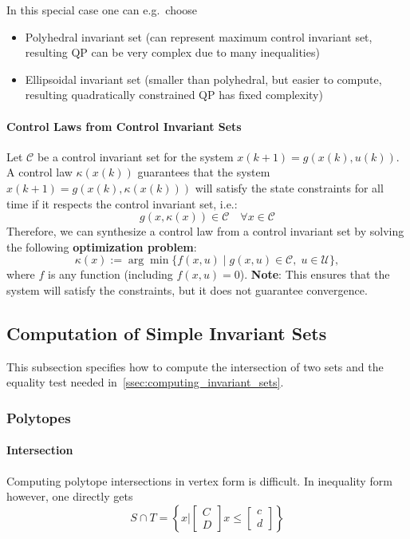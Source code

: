 \newpar{}

In this special case one can e.g.\ choose
\begin{itemize}
    \item Polyhedral invariant set (can represent maximum control invariant set, resulting QP can be very complex due to many inequalities)
    \item Ellipsoidal invariant set (smaller than polyhedral, but easier to compute, resulting quadratically constrained QP has fixed complexity)
\end{itemize}

\paragraph{Control Laws from Control Invariant Sets}

Let $\mathcal{C}$ be a control invariant set for the system $x(k + 1) = g(x(k), u(k))$.
\newpar{}
A control law $\kappa(x(k))$ guarantees that the system $x(k + 1) = g(x(k), \kappa(x(k)))$ will satisfy the state constraints for all time if it respects the control invariant set, i.e.:
\begin{equation*}
    g(x, \kappa(x)) \in \mathcal{C} \quad \forall x \in \mathcal{C}
\end{equation*}
Therefore, we can synthesize a control law from a control invariant set by solving the following \textbf{optimization problem}:
\begin{equation*}
    \kappa(x) := \arg\min \{ f(x, u) \mid g(x, u) \in \mathcal{C},\; u \in \mathcal{U} \},
\end{equation*}
where $f$ is any function (including $f(x, u) = 0$).
\newpar{}
\textbf{Note}: This ensures that the system will satisfy the constraints, but it does not guarantee convergence.

\subsection{Computation of Simple Invariant Sets}
This subsection specifies how to compute the intersection of two sets and the equality test needed in~\ref{ssec:computing_invariant_sets}.      %
\subsubsection{Polytopes}
\paragraph{Intersection}
Computing polytope intersections in vertex form is difficult. In inequality form however, one directly gets
\begin{equation*}
    S \cap T = \left\{x \Bigg|\begin{bmatrix}
        C \\D
    \end{bmatrix}x \leq \begin{bmatrix}
        c \\d
    \end{bmatrix}\right\}
\end{equation*}

